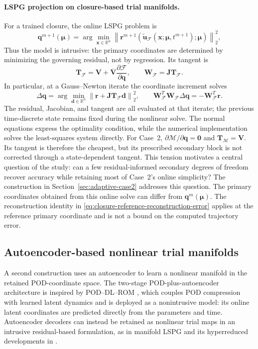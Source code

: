 \documentclass[11pt]{article}
\newcommand{\q}{\mathbf q}
\newcommand{\qp}{\q}
\newcommand{\utilde}{\widetilde{\mathbf u}}
\newcommand{\mub}{\bm\mu}
\newcommand{\norm}[1]{\left\lVert #1 \right\rVert}
\begin{document}
\paragraph{LSPG projection on closure-based trial manifolds.}
For a trained closure, the online LSPG problem is
\begin{equation}
\qp^{m+1}(\mub)=\arg\min_{\mathbf x\in\mathbb R^n}
\norm{\mathbf r^{m+1}(\utilde_{\mathcal F}
(\mathbf x;\mub,t^{m+1});\mub)}_2^2,
\label{eq:closure-lspg}
\end{equation}
Thus the model is intrusive: the primary coordinates are determined by
minimizing the governing residual, not by regression.  Its tangent is
\begin{equation}
\mathbf T_{\mathcal F}=\mathbf V+\overline{\mathbf V}
\frac{\partial\mathcal F}{\partial\qp},\qquad
\mathbf W_{\mathcal F}=\mathbf J\mathbf T_{\mathcal F}.
\label{eq:closure-tangent}
\end{equation}
In particular, at a Gauss--Newton iterate the coordinate increment solves
\begin{equation}
\Delta\q=\arg\min_{\mathbf d\in\mathbb R^n}
\norm{\mathbf r+\mathbf J\mathbf T_{\mathcal F}\mathbf d}_2^2,
\qquad
\mathbf W_{\mathcal F}^T\mathbf W_{\mathcal F}\Delta\q
=-\mathbf W_{\mathcal F}^T\mathbf r.
\label{eq:closure-gn}
\end{equation}
The residual, Jacobian, and tangent are all evaluated at that iterate;
the previous time-discrete state remains fixed during the nonlinear solve.
The normal equations express the optimality condition, while the numerical
implementation solves the least-squares system directly.
For Case~2, $\partial\mathcal M/\partial\qp=\mathbf0$ and
$\mathbf T_{\mathcal M}=\mathbf V$.  Its tangent is therefore the cheapest,
but its prescribed secondary block is not corrected through a
state-dependent tangent.  This tension motivates a central question of the
study: can a few residual-informed secondary degrees of freedom recover
accuracy while retaining most of Case~2's online simplicity?  The
construction in Section~\ref{sec:adaptive-case2} addresses this question.
The primary coordinates obtained from this online solve can differ from
$\q^m(\mub)$.  The reconstruction identity in
\eqref{eq:closure-reference-reconstruction-error} applies at the reference
primary coordinate and is not a bound on the computed trajectory error.

\subsection{Autoencoder-based nonlinear trial manifolds}
A second construction uses an autoencoder to learn a nonlinear manifold in
the retained POD-coordinate space.  The two-stage POD-plus-autoencoder
architecture is inspired by POD--DL--ROM \cite{fresca2022pod}, which couples
POD compression with learned latent dynamics and is deployed as a
nonintrusive model: its online latent coordinates are predicted directly
from the parameters and time.  Autoencoder decoders can instead be retained
as nonlinear trial maps in an intrusive residual-based formulation, as in
manifold LSPG \cite{lee2020model} and its hyperreduced developments in
\cite{romor2025explicable}.
\end{document}

